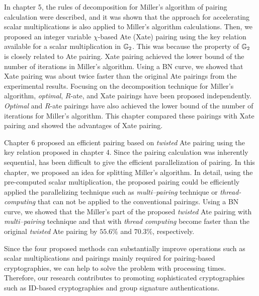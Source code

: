 In chapter 5, the rules of decomposition for Miller's algorithm of pairing calculation were described, and it was shown that the approach for accelerating scalar multiplications is also applied to Miller's algorithm calculations.
Then, we proposed an integer variable $\chi$-based Ate (Xate) pairing using the key relation available for a scalar multiplication in ${\mathbb{G}}_{2}$.
This was because the property of ${\mathbb{G}}_{2}$ is closely related to Ate pairing.
Xate pairing achieved the lower bound of the number of iterations in Miller's algorithm.
Using a BN curve, we showed that Xate pairing was about twice faster than the original Ate pairings from the experimental results.
Focusing on the decomposition technique for Miller's algorithm, {\it optimal}, $R$-ate, and Xate pairings have been proposed independently.
{\it Optimal} and $R$-ate pairings have also achieved the lower bound of the number of iterations for Miller's algorithm.
This chapter compared these pairings with Xate pairing and showed the advantages of Xate pairing.

Chapter 6 proposed an efficient pairing based on {\it twisted} Ate pairing using the key relation proposed in chapter 4.
Since the pairing calculation was inherently sequential, has been difficult to give the efficient parallelization of pairing.
In this chapter, we proposed an idea for splitting Miller's algorithm. 
In detail, using the pre-computed scalar multiplication, the proposed pairing could be efficiently applied the parallelizing technique such as {\it multi--pairing} technique or {\it thread-computing} that can not be applied to the conventional pairings.
Using a BN curve, we showed that the Miller's part of the proposed {\it twisted} Ate pairing with {\it multi--pairing} technique and that with {\it thread computing} become faster than the original {\it twisted} Ate pairing by $55.6\%$ and $70.3\%$, respectively.

Since the four proposed methods can substantially improve operations such as scalar multiplications and pairings mainly required for pairing-based cryptographies, we can help to solve the problem with processing times.  
Therefore, our research contributes to promoting sophisticated cryptographies such as ID-based cryptographies and group signature authentications. 